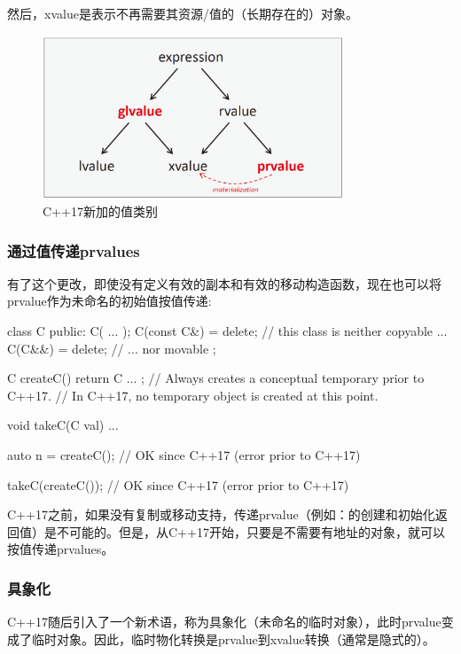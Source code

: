 然后，xvalue是表示不再需要其资源/值的（长期存在的）对象。

\begin{figure}
	\includegraphics[width=0.8\textwidth]{part1/ch8/images/2}
	\caption{C++17新加的值类别}
\end{figure}

\subsubsection{通过值传递prvalues}

有了这个更改，即使没有定义有效的副本和有效的移动构造函数，现在也可以将prvalue作为未命名的初始值按值传递:

\begin{cppcode}
class C {
	public:
	C( ... );
	C(const C&) = delete; // this class is neither copyable ...
	C(C&&) = delete; // ... nor movable
};

C createC() {
	return C{ ... }; // Always creates a conceptual temporary prior to C++17.
} // In C++17, no temporary object is created at this point.

void takeC(C val) {
	...
}

auto n = createC(); // OK since C++17 (error prior to C++17)

takeC(createC()); // OK since C++17 (error prior to C++17)
\end{cppcode}

C++17之前，如果没有复制或移动支持，传递prvalue（例如：的创建和初始化返回值）是不可能的。但是，从C++17开始，只要是不需要有地址的对象，就可以按值传递prvalues。

\subsubsection{具象化}

C++17随后引入了一个新术语，称为具象化（未命名的临时对象），此时prvalue变成了临时对象。因此，临时物化转换是prvalue到xvalue转换（通常是隐式的）。

